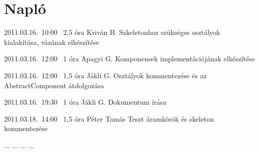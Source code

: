 %
\section{Napló}

\begin{naplo}

\bejegyzes
{2011.03.16.~10:00~} %
{2,5 óra} %
{Kriván B.} %
{Szkeletonhoz szükséges osztályok kialakítása, vázának elkészítése} %

\bejegyzes
{2011.03.16.~12:00~} %
{1 óra} %
{Apagyi G.} %
{Komponensek implementációjának elkészítése} %

\bejegyzes
{2011.03.16.~12:00~} %
{1,5 óra} %
{Jákli G.} %
{Osztályok kommentezése és az AbstractComponent átdolgozása} %

\bejegyzes
{2011.03.16.~19:30~} %
{1 óra} %
{Jákli G.} %
{Dokumentum írása} %

\bejegyzes
{2011.03.18.~14:00~} %
{1,5 óra} %
{Péter Tamás} %
{Teszt áramkörök és skeleton kommentezése} %

\bejegyzes
{...}
{...}
{...}
{...}


\end{naplo}

